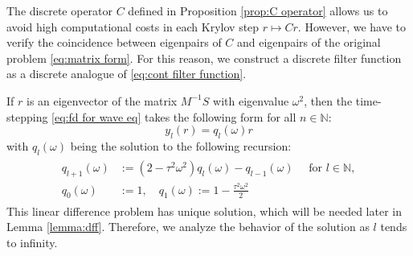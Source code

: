 \documentclass[a4paper,11pt,bibliography=totoc,listof=totoc,headinclude=true,cleardoublepage=empty,oneside]{scrbook}
\newcommand{\N}{\mathbb{N}}
\begin{document}
The discrete operator $C$ defined in Proposition \ref{prop:C operator} allows us to avoid high computational costs in each Krylov step $r \mapsto Cr$. However, we have to verify the coincidence between eigenpairs of $C$ and eigenpairs of the original problem \eqref{eq:matrix form}. For this reason, we construct a discrete filter function as a discrete analogue of \eqref{eq:cont filter function}.

If $r$ is an eigenvector of the matrix $M^{-1}S$ with eigenvalue $\omega^2$, then the time-stepping \eqref{eq:fd for wave eq} takes the following form for all $n\in \N$:
\begin{equation}\label{eq:y_l q_l}
    y_l(r) = q_l(\omega)r  
\end{equation}
with $q_l(\omega)$ being the solution to the following recursion:
\begin{align}\label{eq:q def}
    \begin{split}
        q_{l+1}(\omega) &:= (2-\tau^2\omega^2) q_l(\omega) - q_{l-1}(\omega) \quad \text{ for } l \in \N,\\
        q_0(\omega) &:= 1, \quad q_1(\omega) := 1 - \frac{\tau^2\omega^2}{2} 
    \end{split}
\end{align}
This linear difference problem has unique solution, which will be needed later in Lemma \ref{lemma:dff}. Therefore, we analyze the behavior of the solution as $l$ tends to infinity.
\end{document}
